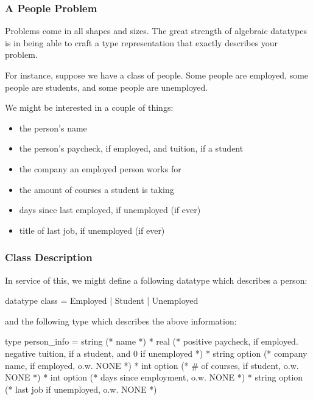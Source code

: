 \documentclass[aspectratio=169]{beamer}
\begin{document}

\begin{frame}[fragile]
  \frametitle{A People Problem}

  Problems come in all shapes and sizes. The great strength of algebraic datatypes
  is in being able to craft a type representation that exactly describes your problem.

  \pause
  \vspace{\fill}

  For instance, suppose we have a class of people. Some people are employed, some
  people are students, and some people are unemployed.

  \pause
  \vspace{\fill}

  We might be interested in a couple of things:
  \begin{itemize}
    \item the person's name
    \item the person's paycheck, if employed, and tuition, if a student
    \item the company an employed person works for
    \item the amount of courses a student is taking
    \item days since last employed, if unemployed (if ever)
    \item title of last job, if unemployed (if ever)
  \end{itemize}
\end{frame}

\begin{frame}[fragile]
  \frametitle{Class Description}

  In service of this, we might define a following datatype which describes a person:
  \begin{codeblock}
    datatype class = Employed | Student | Unemployed
  \end{codeblock}

  \pause
  and the following type which describes the above information:
  \begin{codeblock}
    type person_info =
      string (* name *)
      * real (* positive paycheck, if employed. negative
                tuition, if a student, and 0 if unemployed *)
      * string option (* company name, if employed, o.w. NONE *)
      * int option    (* # of courses, if student, o.w. NONE *)
      * int option    (* days since employment, o.w. NONE *)
      * string option (* last job if unemployed, o.w. NONE *)
  \end{codeblock}
\end{frame}
\end{document}
